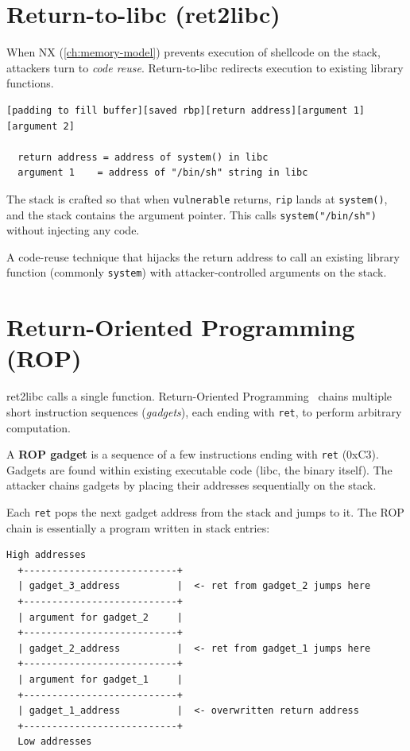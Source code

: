 \section{Return-to-libc (ret2libc)}

When NX (\ref{ch:memory-model}) prevents execution of shellcode on the stack, attackers turn to \emph{code reuse}. Return-to-libc redirects execution to existing library functions.

\begin{lstlisting}[caption=ret2libc exploit layout]
  [padding to fill buffer][saved rbp][return address][argument 1][argument 2]

  return address = address of system() in libc
  argument 1    = address of "/bin/sh" string in libc
\end{lstlisting}

The stack is crafted so that when \texttt{vulnerable} returns, \texttt{rip} lands at \texttt{system()}, and the stack contains the argument pointer. This calls \texttt{system("/bin/sh")} without injecting any code.

\begin{definition}
	A code-reuse technique that hijacks the return address to call an existing library function (commonly \texttt{system}) with attacker-controlled arguments on the stack.
\end{definition}

\section{Return-Oriented Programming (ROP)}

ret2libc calls a single function. Return-Oriented Programming~\cite{shacham2007return} chains multiple short instruction sequences (\emph{gadgets}), each ending with \texttt{ret}, to perform arbitrary computation.

\begin{definition}
	A \textbf{ROP gadget} is a sequence of a few instructions ending with \texttt{ret} (0xC3). Gadgets are found within existing executable code (libc, the binary itself). The attacker chains gadgets by placing their addresses sequentially on the stack.
\end{definition}

Each \texttt{ret} pops the next gadget address from the stack and jumps to it. The ROP chain is essentially a program written in stack entries:

\begin{lstlisting}[caption=ROP chain on the stack]
  High addresses
  +---------------------------+
  | gadget_3_address          |  <- ret from gadget_2 jumps here
  +---------------------------+
  | argument for gadget_2     |
  +---------------------------+
  | gadget_2_address          |  <- ret from gadget_1 jumps here
  +---------------------------+
  | argument for gadget_1     |
  +---------------------------+
  | gadget_1_address          |  <- overwritten return address
  +---------------------------+
  Low addresses
\end{lstlisting}

